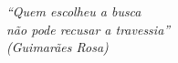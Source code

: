 
    \vspace*{\fill}
	\begin{flushright}
		\textit{``Quem escolheu a busca\\
			  não pode recusar a travessia''\\
				      (Guimarães Rosa)
			}
	\end{flushright}


